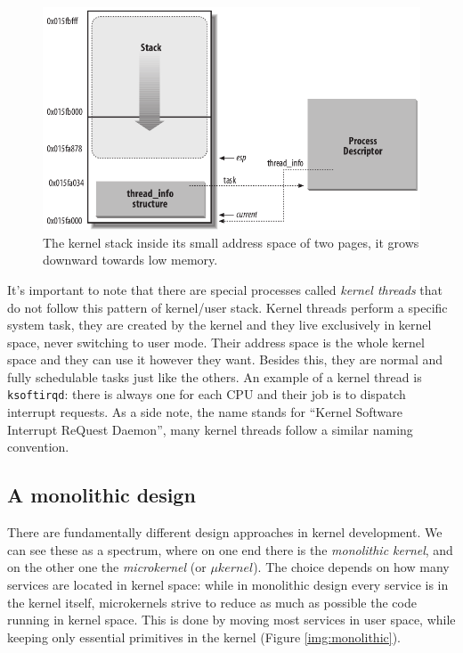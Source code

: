 \documentclass[10pt, oneside]{book}
\begin{document}
\begin{figure}[ht]
\includegraphics[width=\textwidth]{images/stack.png}
\caption{The kernel stack inside its small address space of two pages, it grows downward towards low memory.}
\label{img:stack}
\end{figure}

It's important to note that there are special processes called \textit{kernel threads} that do not follow this pattern of kernel/user stack. Kernel threads perform a specific system task, they are created by the kernel and they live exclusively in kernel space, never switching to user mode. Their address space is the whole kernel space and they can use it however they want. Besides this, they are normal and fully schedulable tasks just like the others. An example of a kernel thread is \verb|ksoftirqd|: there is always one for each CPU and their job is to dispatch interrupt requests. As a side note, the name stands for ``Kernel Software Interrupt ReQuest Daemon'', many kernel threads follow a similar naming convention. 

\subsection{A monolithic design} %
\label{sec:monolithic}
There are fundamentally different design approaches in kernel development. We can see these as a spectrum, where on one end there is the \textit{monolithic kernel}, and on the other one the \textit{microkernel} (or $\mu kernel$). The choice depends on how many services are located in kernel space: while in monolithic design every service is in the kernel itself, microkernels strive to reduce as much as possible the code running in kernel space. This is done by moving most services in user space, while keeping only essential primitives in the kernel (Figure \ref{img:monolithic}).
\end{document}
